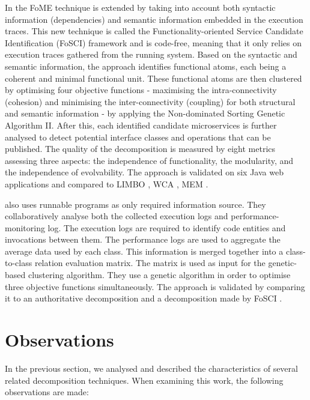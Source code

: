 In \citeauthor{jin2019service} \cite{jin2019service} the FoME technique is extended by taking into account both syntactic information (dependencies) and semantic information embedded in the execution traces. This new technique is called the Functionality-oriented Service Candidate Identification (FoSCI) framework and is code-free, meaning that it only relies on execution traces gathered from the running system. Based on the syntactic and semantic information, the approach identifies functional atoms, each being a coherent and minimal functional unit. These functional atoms are then clustered by optimising four objective functions - maximising the intra-connectivity (cohesion) and minimising the inter-connectivity (coupling) for both structural and semantic information - by applying the Non-dominated Sorting Genetic Algorithm II. After this, each identified candidate microservices is further analysed to detect potential interface classes and operations that can be published. The quality of the decomposition is measured by eight metrics assessing three aspects: the independence of functionality, the modularity, and the independence of evolvability. The approach is validated on six Java web applications and compared to LIMBO \cite{andritsos2005information}, WCA \cite{chatterjee2002wca}, MEM \cite{mazlami2017extraction}. \par
\citeauthor{zhang2020automated} \cite{zhang2020automated} also uses runnable programs as only required information source. They collaboratively analyse both the collected execution logs and performance-monitoring log. The execution logs are required to identify code entities and invocations between them. The performance logs are used to aggregate the average data used by each class. This information is merged together into a class-to-class relation evaluation matrix. The matrix is used as input for the genetic-based clustering algorithm. They use a genetic algorithm in order to optimise three objective functions simultaneously. The approach is validated by comparing it to an authoritative decomposition and a decomposition made by FoSCI \cite{jin2019service}.

\section{Observations}\label{s:literature_review_observations}
In the previous section, we analysed and described the characteristics of several related decomposition techniques. When examining this work, the following observations are made:

